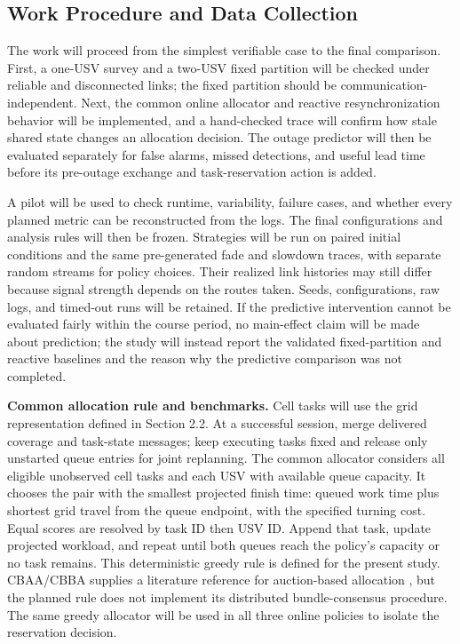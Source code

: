 \subsection{Work Procedure and Data Collection}

The work will proceed from the simplest verifiable case to the final comparison. First, a one-USV survey and a two-USV fixed partition will be checked under reliable and disconnected links; the fixed partition should be communication-independent. Next, the common online allocator and reactive resynchronization behavior will be implemented, and a hand-checked trace will confirm how stale shared state changes an allocation decision. The outage predictor will then be evaluated separately for false alarms, missed detections, and useful lead time before its pre-outage exchange and task-reservation action is added.

A pilot will be used to check runtime, variability, failure cases, and whether every planned metric can be reconstructed from the logs. The final configurations and analysis rules will then be frozen. Strategies will be run on paired initial conditions and the same pre-generated fade and slowdown traces, with separate random streams for policy choices. Their realized link histories may still differ because signal strength depends on the routes taken. Seeds, configurations, raw logs, and timed-out runs will be retained. If the predictive intervention cannot be evaluated fairly within the course period, no main-effect claim will be made about prediction; the study will instead report the validated fixed-partition and reactive baselines and the reason why the predictive comparison was not completed.

\textbf{Common allocation rule and benchmarks.}
Cell tasks will use the grid representation defined in Section 2.2. At a successful session, merge delivered coverage and task-state messages; keep executing tasks fixed and release only unstarted queue entries for joint replanning. The common allocator considers all eligible unobserved cell tasks and each USV with available queue capacity. It chooses the pair with the smallest projected finish time: queued work time plus shortest grid travel from the queue endpoint, with the specified turning cost. Equal scores are resolved by task ID then USV ID. Append that task, update projected workload, and repeat until both queues reach the policy's capacity or no task remains. This deterministic greedy rule is defined for the present study. CBAA/CBBA supplies a literature reference for auction-based allocation \cite{choi2009auction}, but the planned rule does not implement its distributed bundle-consensus procedure. The same greedy allocator will be used in all three online policies to isolate the reservation decision.

